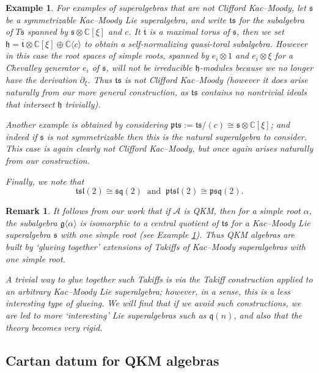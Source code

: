 \documentclass[10pt,a4paper]{amsart}
\newtheorem{example}{Example}
\newtheorem{remark}{Remark}
\def\AA{\mathcal{A}}
\def\C{\mathbb{C}}
\def\d{\partial}
\def\g{\mathfrak{g}}
\def\h{\mathfrak{h}}
\def\l{\mathfrak{l}}
\def\ol{\overline}
\def\p{\mathfrak{p}}
\def\q{\mathfrak{q}}
\def\s{\mathfrak{s}}
\begin{document}
	\begin{example}\label{example_ts_pts}
		For examples of superalgebras that are not Clifford Kac--Moody, let $\s$ be a symmetrizable Kac--Moody Lie superalgebra, and write $\mathfrak{t}\s$ for the subalgebra of $T\s$ spanned by $\s\otimes\C[\xi]$ and $c$.  It $\ol{\mathfrak{t}}$ is a maximal torus of $\s$, then we set $\h=\ol{\mathfrak{t}}\otimes\C[\xi]\oplus\C\langle c\rangle$ to obtain a self-normalizing quasi-toral subalgebra.  However in this case the root spaces of simple roots, spanned by $e_i\otimes 1$ and $e_i\otimes\xi$ for a Chevalley generator $e_i$ of $\s$, will not be irreducible $\h$-modules because we no longer have the derivation $\d_{\xi}$.  Thus $\mathfrak{t}\s$ is not Clifford Kac--Moody (however it does arise naturally from our more general construction, as $\mathfrak{t}\s$ contains no nontrivial ideals that intersect $\h$ trivially).  
		
		Another example is obtained by considering $\p\mathfrak{t}\s:=\mathfrak{t}\s/(c)\cong\s\otimes\C[\xi]$; and indeed if $\mathfrak{s}$ is not symmetrizable then this is the natural superalgebra to consider.  This case is again clearly not Clifford Kac--Moody, but once again arises naturally from our construction.
		
		Finally, we note that 
		\[
		\mathfrak{t}\s\l(2)\cong\s\q(2) \ \text{ and } \ \mathfrak{pt}\s\l(2)\cong\p\s\q(2).
		\]
	\end{example}

	\begin{remark}
		It follows from our work that if $\AA$ is QKM, then for a simple root $\alpha$, the subalgebra $\g\langle\alpha\rangle$ is isomorphic to a central quotient of $\mathfrak{t}\s$ for a Kac--Moody Lie superalgebra $\mathfrak{s}$ with one simple root (see Example \ref{example_ts_pts}).  Thus QKM algebras are built by `glueing together' extensions of Takiffs of Kac--Moody superalgebras with one simple root.
		
		A trivial way to glue together such Takiffs is via the Takiff construction applied to an arbitrary Kac--Moody Lie superalgebra; however, in a sense, this is a less interesting type of glueing.  We will find that if we avoid such constructions, we are led to more `interesting' Lie superalgebras such as $\q(n)$, and also that the theory becomes very rigid.
	\end{remark}
	
	\subsection{Cartan datum for QKM algebras}\label{section-notation-QKM}
	
\end{document}
